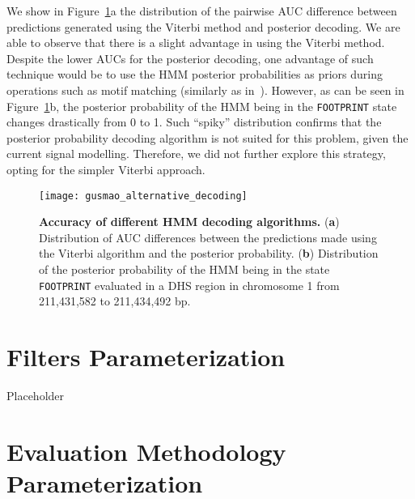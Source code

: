 We show in Figure~\ref{fig:gusmao_alternative_decoding}a the distribution of the pairwise AUC difference between predictions generated using the Viterbi method and posterior decoding. We are able to observe that there is a slight advantage in using the Viterbi method. Despite the lower AUCs for the posterior decoding, one advantage of such technique would be to use the HMM posterior probabilities as priors during operations such as motif matching (similarly as in~\cite{cuellar2012}). However, as can be seen in Figure~\ref{fig:gusmao_alternative_decoding}b, the posterior probability of the HMM being in the {\tt FOOTPRINT} state changes drastically from 0 to 1. Such ``spiky'' distribution confirms that the posterior probability decoding algorithm is not suited for this problem, given the current signal modelling. Therefore, we did not further explore this strategy, opting for the simpler Viterbi approach.

\begin{figure}[h!]
\centering
\texttt{[image: gusmao\_alternative\_decoding]}
\caption[Accuracy of different HMM decoding algorithms]{\textbf{Accuracy of different HMM decoding algorithms.} (\textbf{a}) Distribution of AUC differences between the predictions made using the Viterbi algorithm and the posterior probability. (\textbf{b}) Distribution of the posterior probability of the HMM being in the state {\tt FOOTPRINT} evaluated in a DHS region in chromosome 1 from 211,431,582 to 211,434,492 bp.}
\label{fig:gusmao_alternative_decoding}
\end{figure}

\section{Filters Parameterization}
\label{sec:filters.parameterization}

Placeholder

\section{Evaluation Methodology Parameterization}
\label{sec:evaluation.methodology.parameterization}


